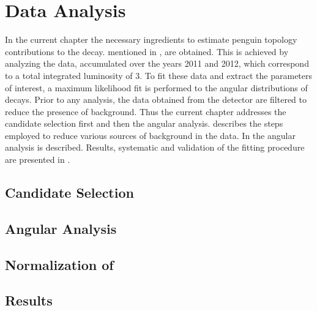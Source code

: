 \chapter{Data Analysis}
\label{Data_Analysis}

In the current chapter the necessary ingredients to estimate penguin topology contributions to the \BsJpsiPhi 
decay. mentioned in , are obtained. This is achieved by analyzing the \runone \lhcb data, 
accumulated over the years 2011 and 2012, which correspond to a total integrated luminosity of 3\invfb. 
To fit these data and extract the parameters of 
interest, a maximum likelihood fit is performed to the angular distributions of \BsJpsiKst decays.
Prior to any analysis, the data obtained from the detector are filtered to reduce the presence of
background. Thus the current chapter addresses the \Bs candidate selection first and then the angular analysis.
 describes the steps employed to reduce various sources of background in the data. 
In  the angular analysis is described. Results, systematic and validation of 
the fitting procedure are presented in .    

\section{Candidate Selection}
\label{Event_Selection}


\section{Angular Analysis}
\label{Angular_Analysis}


\section{Normalization of \BsJpsiKpi}
\label{Normalization}


\section{Results}
\label{Results}

